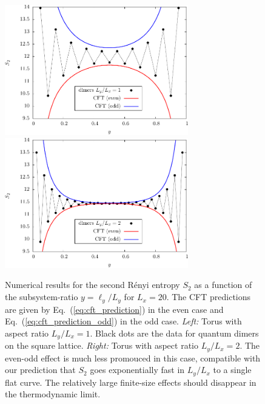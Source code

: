 \documentclass[11pt]{iopart}
\begin{document}
\begin{figure}[ht]
\begin{center}
 \includegraphics[width=8cm]{./figures/dimers_shape.pdf}
 \includegraphics[width=8cm]{./figures/dimers_shape2.pdf}
 \end{center}
 \caption{Numerical results for the second R\'enyi entropy $S_2$ as a function of the subsystem-ratio $y=\ell_y/L_y$ for $L_x=20$. The CFT predictions are given by Eq.~(\ref{eq:cft_prediction}) in the even case and Eq.~(\ref{eq:cft_prediction_odd}) in the odd case. \emph{Left:} Torus with aspect ratio $L_y/L_x=1$. Black dots are the data for quantum dimers on the square lattice. \emph{Right:} Torus with aspect ratio $L_y/L_x=2$. The even-odd effect is much less promouced in this case, compatible with our prediction that $S_2$ goes exponentially fast in $L_y/L_x$ to a single flat curve. The relatively large finite-size effects should disappear in the thermodynamic limit.}
 \label{fig:dimers_shape}
\end{figure}
\end{document}
